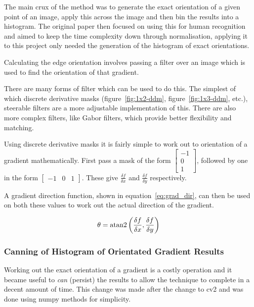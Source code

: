 The main crux of the method was to generate the exact orientation of a given point of an image,
apply this across the image and then bin the results into a histogram. The original paper then
focused on using this for human recognition and aimed to keep the time complexity down through
normalisation, applying it to this project only needed the generation of the histogram of exact
orientations.

Calculating the edge orientation involves passing a filter over an image which is used to find the
orientation of that gradient. 

There are many forms of filter which can be used to do this. The simplest of which discrete 
derivative masks (figure~\ref{fig:1x2-ddm}, figure~\ref{fig:1x3-ddm}, etc.), steerable filters 
are a more adjustable implementation of this. There are also more complex filters, like Gabor 
filters, which provide better flexibility and matching.

Using discrete derivative masks it is fairly simple to work out to orientation of a gradient 
mathematically. First pass a mask of the form $\left[\begin{smallmatrix}-1\\0\\1\end{smallmatrix}\right]$, followed
by one in the form $\left[\begin{smallmatrix}-1 & 0 & 1\end{smallmatrix}\right]$. These give 
$\frac{\delta f}{\delta x}$ and $\frac{\delta f}{\delta y}$ respectively.

A gradient direction function, shown in equation~\ref{eq:grad_dir}, can then be used on both these
values to work out the actual direction of the gradient.

\begin{equation} \label{eq:grad_dir}
\theta = {\rm atan2}\left( \frac{\delta f}{\delta x}, \frac{\delta f}{\delta y} \right)
\end{equation}

\subsubsection{Canning of Histogram of Orientated Gradient Results}\label{sec:hog-canning}
Working out the exact orientation of a gradient is a costly operation and it became useful to
\emph{can} (persist) the results to allow the technique to complete in a decent amount of time.
This change was made after the change to \gls{cv2} and was done using numpy methods for
simplicity. 


